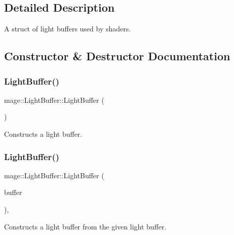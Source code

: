 \subsection{Detailed Description}
A struct of light buffers used by shaders. 

\subsection{Constructor \& Destructor Documentation}
\hypertarget{structmage_1_1_light_buffer_a4febaa8f3e03beb1a150367c137b6975}{}\label{structmage_1_1_light_buffer_a4febaa8f3e03beb1a150367c137b6975} 
\subsubsection{\texorpdfstring{Light\+Buffer()}{LightBuffer()}\hspace{0.1cm}{\footnotesize\ttfamily [1/3]}}
{\footnotesize\ttfamily mage\+::\+Light\+Buffer\+::\+Light\+Buffer (\begin{DoxyParamCaption}{ }\end{DoxyParamCaption})\hspace{0.3cm}{\ttfamily [noexcept]}}

Constructs a light buffer. \hypertarget{structmage_1_1_light_buffer_a345064315aec6c07804d5ee218f4176f}{}\label{structmage_1_1_light_buffer_a345064315aec6c07804d5ee218f4176f} 
\subsubsection{\texorpdfstring{Light\+Buffer()}{LightBuffer()}\hspace{0.1cm}{\footnotesize\ttfamily [2/3]}}
{\footnotesize\ttfamily mage\+::\+Light\+Buffer\+::\+Light\+Buffer (\begin{DoxyParamCaption}\item[{const \hyperlink{structmage_1_1_light_buffer}{Light\+Buffer} \&}]{buffer }\end{DoxyParamCaption})\hspace{0.3cm}{\ttfamily [default]}, {\ttfamily [noexcept]}}

Constructs a light buffer from the given light buffer.


